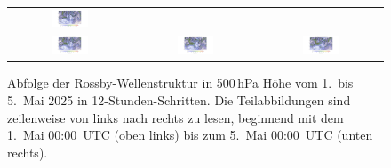 \begin{figure}
\begin{tabular}{ccc}
		\includegraphics[width=0.32\textwidth, trim=5.75cm 3cm 5cm 0.9cm, clip]{papers/rossby/images/weather/data_2025_5_3_12-00_500.pdf}   \\
		\includegraphics[width=0.32\textwidth, trim=5.75cm 3cm 5cm 0.9cm, clip]{papers/rossby/images/weather/data_2025_5_4_00-00_500.pdf} &
		\includegraphics[width=0.32\textwidth, trim=5.75cm 3cm 5cm 0.9cm, clip]{papers/rossby/images/weather/data_2025_5_4_12-00_500.pdf} &
		\includegraphics[width=0.32\textwidth, trim=5.75cm 3cm 5cm 0.9cm, clip]{papers/rossby/images/weather/data_2025_5_5_00-00_500.pdf}   \\
	\end{tabular}
	\caption{Abfolge der Rossby-Wellenstruktur in 500\,hPa Höhe vom 1.\ bis 5.\ Mai 2025 in 12-Stunden-Schritten.
		Die Teilabbildungen sind zeilenweise von links nach rechts zu lesen, beginnend mit dem 1.\ Mai 00:00~UTC (oben links)
		bis zum 5.\ Mai 00:00~UTC (unten rechts).}
	\label{fig:rossby_grid}
\end{figure}


